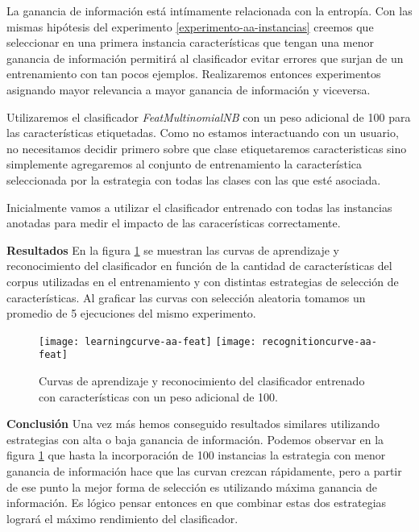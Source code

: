 La ganancia de información está intímamente relacionada con la entropía. Con las mismas hipótesis del experimento \ref{experimento-aa-instancias} creemos que seleccionar en una primera instancia características que tengan una menor ganancia de información permitirá al clasificador evitar errores que surjan de un entrenamiento con tan pocos ejemplos. Realizaremos entonces experimentos asignando mayor relevancia a mayor ganancia de información y viceversa.

Utilizaremos el clasificador \textit{FeatMultinomialNB} con un peso adicional de 100 para las características etiquetadas. Como no estamos interactuando con un usuario, no necesitamos decidir primero sobre que clase etiquetaremos caracteristicas sino simplemente agregaremos al conjunto de entrenamiento la característica seleccionada por la estrategia con todas las clases con las que esté asociada.

Inicialmente vamos a utilizar el clasificador entrenado con todas las instancias anotadas para medir el impacto de las caracerísticas correctamente.

\vspace{3 mm}

\textbf{Resultados} En la figura \ref{comp-feat-selection} se muestran las curvas de aprendizaje y reconocimiento del clasificador en función de la cantidad de características del corpus utilizadas en el entrenamiento y con distintas estrategias de selección de características. Al graficar las curvas con selección aleatoria tomamos un promedio de 5 ejecuciones del mismo experimento.

\begin{figure}[h!]\label{comp-feat-selection}
\centering
\texttt{[image: learningcurve-aa-feat]}
\texttt{[image: recognitioncurve-aa-feat]}
\caption{Curvas de aprendizaje y reconocimiento del clasificador entrenado con características con un peso adicional de 100.}
\end{figure}
\vspace{3 mm}


\textbf{Conclusión}
Una vez más hemos conseguido resultados similares utilizando estrategias con alta o baja ganancia de información. Podemos observar en la figura \ref{comp-feat-selection} que hasta la incorporación de 100 instancias la estrategia con menor ganancia de información hace que las curvan crezcan rápidamente, pero a partir de ese punto la mejor forma de selección es utilizando máxima ganancia de información. Es lógico pensar entonces en que combinar estas dos estrategias logrará el máximo rendimiento del clasificador.

